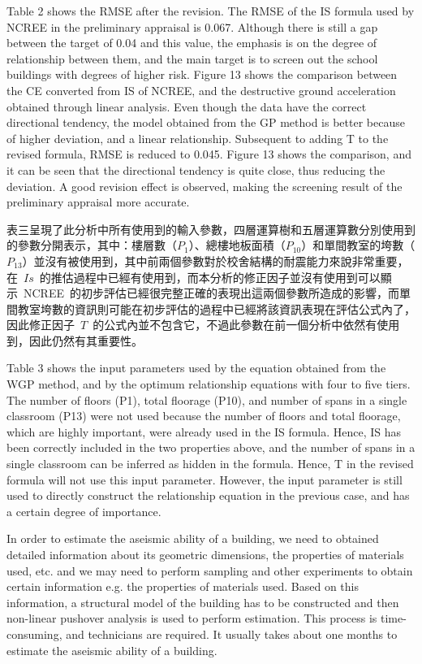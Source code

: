 Table 2 shows the RMSE after the revision. The RMSE of the IS formula used by NCREE in the preliminary appraisal is 0.067. Although there is still a gap between the target of 0.04 and this value, the emphasis is on the degree of relationship between them, and the main target is to screen out the school buildings with degrees of higher risk. Figure 13 shows the comparison between the CE converted from IS of NCREE, and the destructive ground acceleration obtained through linear analysis. Even though the data have the correct directional tendency, the model obtained from the GP method is better because of higher deviation, and a linear relationship. Subsequent to adding T to the revised formula, RMSE is reduced to 0.045. Figure 13 shows the comparison, and it can be seen that the directional tendency is quite close, thus reducing the deviation. A good revision effect is observed, making the screening result of the preliminary appraisal more accurate.

表三呈現了此分析中所有使用到的輸入參數，四層運算樹和五層運算數分別使用到的參數分開表示，其中：樓層數（$P_1$）、總樓地板面積（$P_{10}$）和單間教室的垮數（$P_{13}$）並沒有被使用到，其中前兩個參數對於校舍結構的耐震能力來說非常重要，在~$Is$~的推估過程中已經有使用到，而本分析的修正因子並沒有使用到可以顯示~NCREE~的初步評估已經很完整正確的表現出這兩個參數所造成的影響，而單間教室垮數的資訊則可能在初步評估的過程中已經將該資訊表現在評估公式內了，因此修正因子~$T$~的公式內並不包含它，不過此參數在前一個分析中依然有使用到，因此仍然有其重要性。

Table 3 shows the input parameters used by the equation obtained from the WGP method, and by the optimum relationship equations with four to five tiers. The number of floors (P1), total floorage (P10), and number of spans in a single classroom (P13) were not used because the number of floors and total floorage, which are highly important, were already used in the IS formula. Hence, IS has been correctly included in the two properties above, and the number of spans in a single classroom can be inferred as hidden in the formula. Hence, T in the revised formula will not use this input parameter. However, the input parameter is still used to directly construct the relationship equation in the previous case, and has a certain degree of importance.



In order to estimate the aseismic ability of a building, we need to obtained detailed information about its geometric dimensions, the properties of materials used, etc. and we may need to perform sampling and other experiments to obtain certain information e.g. the properties of materials used. Based on this information, a structural model of the building has to be constructed and then non-linear pushover analysis is used to perform estimation. This process is time-consuming, and technicians are required. It usually takes about one months to estimate the aseismic ability of a building.

